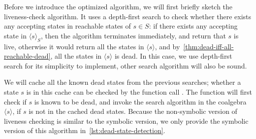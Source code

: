 \documentclass[conference]{IEEEtran}
\DeclareMathOperator{\norm}{\mathrm{norm}}
\begin{document}


Before we introduce the optimized algorithm, we will first briefly sketch the liveness-check algorithm. It uses a depth-first search to check whether there exists any accepting states in reachable states of \(s ∈ S\): if there exists any accepting state in \(⟨s⟩_S\), then the algorithm terminates immediately, and return that \(s\) is live, otherwise it would return all the states in \(⟨s⟩\), and by~\cref{thm:dead-iff-all-reachable-dead}, all the states in \(⟨s⟩\) is dead.
In this case, we use depth-first search for its simplicity to implement, other search algorithm will also be sound.

We will cache all the known dead states from the previous searches; whether a state \(s\) is in this cache can be checked by the function call . 
The function  will first check if \(s\) is known to be dead, and invoke the search algorithm in the coalgebra \(⟨s⟩\), if \(s\) is not in the cached dead states.
Because the non-symbolic version of liveness checking is similar to the symbolic version, we only provide the symbolic version of this algorithm in~\cref{lst:dead-state-detection}.
\end{document}
